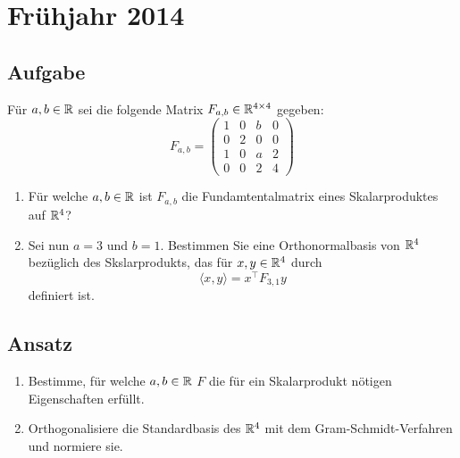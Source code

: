 \newpage

\section{Frühjahr 2014}

\subsection{Aufgabe}
Für \( a,b \in \mathbb{R} \) sei die folgende Matrix \( F_{a,b} \in \mathbb{R}^{4 \times 4} \) gegeben:
\begin{equation*}
	F_{a,b} = \begin{pmatrix}
		1 & 0 & b & 0 \\
		0 & 2 & 0 & 0 \\
		1 & 0 & a & 2 \\
		0 & 0 & 2 & 4
	\end{pmatrix}
\end{equation*}
\begin{enumerate}
	\item Für welche \( a,b \in \mathbb{R} \) ist \( F_{a,b} \) die Fundamtentalmatrix eines Skalarproduktes auf \( \mathbb{R}^4 \)?
	\item Sei nun \( a=3 \) und \( b=1 \). Bestimmen Sie eine Orthonormalbasis von \( \mathbb{R}^4 \) bezüglich des Skslarprodukts, das für \( x,y \in \mathbb{R}^4 \) durch
		\begin{equation*}
		 	\langle x,y \rangle = x^\top F_{3,1}y
		 \end{equation*} 
		 definiert ist.
\end{enumerate}

\subsection{Ansatz}
\begin{enumerate}
	\item Bestimme, für welche \( a,b \in \mathbb{R} \) \( F \) die für ein Skalarprodukt nötigen Eigenschaften erfüllt.
	\item Orthogonalisiere die Standardbasis des \( \mathbb{R}^4 \) mit dem Gram-Schmidt-Verfahren und normiere sie. 
\end{enumerate}

